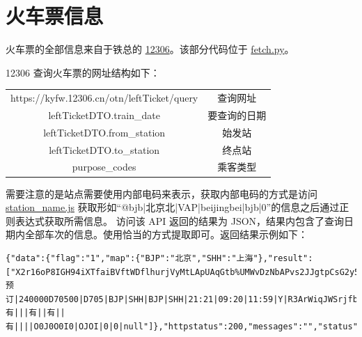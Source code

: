 \documentclass[lang=cn,blue,13pt]{elegantbook}
\begin{document}
\section{火车票信息}
火车票的全部信息来自于铁总的 \href{https://www.12306.cn}{12306}。该部分代码位于 \href{https://github.com/kuso-kodo/kuso_12306/blob/master/src_12306/fetch.py}{fetch.py}。

12306 查询火车票的网址结构如下：
\begin{center}
	\begin{tabular}{cc}
		\hline
		\makebox[0.5\textwidth][c]{参数}	&  \makebox[0.2\textwidth][c]{含义} \\ \hline
		https://kyfw.12306.cn/otn/leftTicket/query & 查询网址 \\
		leftTicketDTO.train\_date & 要查询的日期 \\
		leftTicketDTO.from\_station & 始发站 \\
		leftTicketDTO.to\_station & 终点站 \\
		purpose\_codes & 乘客类型 \\ \hline
	\end{tabular}
\end{center}
需要注意的是站点需要使用内部电码来表示，获取内部电码的方式是访问 \href{https://kyfw.12306.cn/otn/resources/js/framework/station\_name.js}{station\_name.js} 获取形如``@bjb|北京北|VAP|beijingbei|bjb|0''的信息之后通过正则表达式获取所需信息。
访问该 API 返回的结果为 JSON，结果内包含了查询日期内全部车次的信息。使用恰当的方式提取即可。返回结果示例如下：
\begin{lstlisting}[language={}]
{"data":{"flag":"1","map":{"BJP":"北京","SHH":"上海"},"result":["X2r16oP8IGH94iXTfaiBVftWDflhurjVyMtLApUAqGtb%UMWvDzNbAPvs2JJgtpCsG2y5VUJ2l5mC%0AbxIfI7x4izoLOx2%2FQrCgmSw0FTE0HJRw34xqltxHR6QvsJs8ZzcVyUtiZ6O57m%2Btt%2BS7QUfVl23M%0AYkqXZBJdFwX3qw33jZUkU0PLe%2FYfzcinUaZk6VpcbaHLuYoflN4kdE6Vk%2BPrYGpwqehRkGoTElzS%0A8naAdzOg1VyR8vffGyFCZ%2B4F9ZbIMrm0Hm1cVV%2BA2RsOgIps8IwLambwpZ76GgZZRZj0O6%2B0TkGY%0AG8DGrhYOPKg%3D|预订|240000D70500|D705|BJP|SHH|BJP|SHH|21:21|09:20|11:59|Y|R3ArWiqJWSrjfblWAofOiX3%2Bo5Q7Ud8vVMTg1pnCJxohcTRTmikvHJ7nmlo%3D|20190530|3|P4|01|04|0|0||||有|||有||有||有||||O0J0O0I0|OJOI|0|0|null"]},"httpstatus":200,"messages":"","status":true}
\end{lstlisting}
\end{document}
